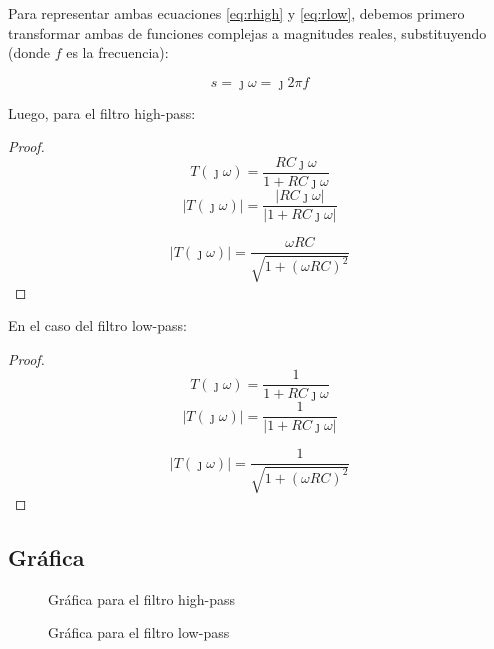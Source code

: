 \documentclass{article}[12pt,a4paper]
\begin{document}
Para representar ambas ecuaciones \ref{eq:rhigh} y \ref{eq:rlow}, debemos primero transformar ambas de funciones complejas a magnitudes reales, substituyendo (donde \(f\) es la frecuencia):

\begin{equation*}
  s=\jmath\omega=\jmath2\pi f
\end{equation*}

Luego, para el filtro high-pass:

\begin{proof}

  $$T(\jmath\omega)=\frac{RC\jmath\omega}{1+RC\jmath\omega}$$
  $$\left|T(\jmath\omega)\right|=\frac{\left|RC\jmath\omega\right|}{\left|1+RC\jmath\omega\right|}$$

  \begin{equation}
    \left|T(\jmath\omega)\right|=\frac{\omega RC}{\sqrt{1+\left(\omega RC\right)^2}}
    \label{eq:realhigh}
  \end{equation}
\end{proof}

En el caso del filtro low-pass:

\begin{proof}

  $$T(\jmath\omega)=\frac{1}{1+RC\jmath\omega}$$
  $$\left|T(\jmath\omega)\right|=\frac{1}{\left|1+RC\jmath\omega\right|}$$

  \begin{equation}
    \left|T(\jmath\omega)\right|=\frac{1}{\sqrt{1+\left(\omega RC\right)^2}}
    \label{eq:reallow}
  \end{equation}
\end{proof}

\subsection{Gráfica}

\begin{figure}
  
  \caption{Gráfica para el filtro high-pass}
\end{figure}

\begin{figure}
  
  \caption{Gráfica para el filtro low-pass}
\end{figure}
\end{document}
